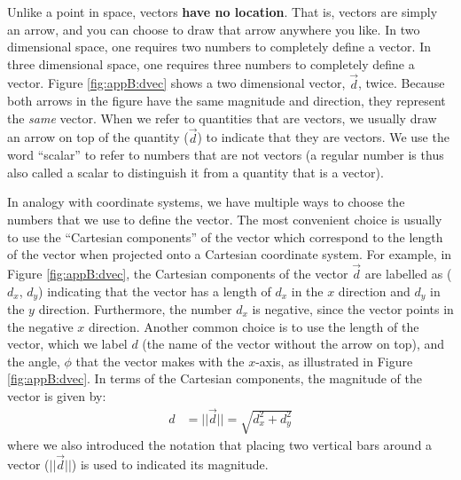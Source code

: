 Unlike a point in space, vectors \textbf{have no location}. That is, vectors are simply an arrow, and you can choose to draw that arrow anywhere you like. In two dimensional space, one requires two numbers to completely define a vector. In three dimensional space, one requires three numbers to completely define a vector. Figure \ref{fig:appB:dvec} shows a two dimensional vector, $\vec d$, twice. Because both arrows in the figure have the same magnitude and direction, they represent the \textit{same} vector. When we refer to quantities that are vectors, we usually draw an arrow on top of the quantity ($\vec d$) to indicate that they are vectors. We use the word ``scalar'' to refer to numbers that are not vectors (a regular number is thus also called a scalar to distinguish it from a quantity that is a vector).


In analogy with coordinate systems, we have multiple ways to choose the numbers that we use to define the vector. The most convenient choice is usually to use the ``Cartesian components'' of the vector which correspond to the length of the vector when projected onto a Cartesian coordinate system. For example, in Figure \ref{fig:appB:dvec}, the Cartesian components of the vector $\vec d$ are labelled as ($d_x$, $d_y$) indicating that the vector has a length of $d_x$ in the $x$ direction and $d_y$ in the $y$ direction. Furthermore, the number $d_x$ is negative, since the vector points in the negative $x$ direction. Another common choice is to use the length of the vector, which we label $d$ (the name of the vector without the arrow on top), and the angle, $\phi$ that the vector makes with the $x$-axis, as illustrated in Figure \ref{fig:appB:dvec}. In terms of the Cartesian components, the magnitude of the vector is given by:
\begin{align*}
d&= ||\vec d||= \sqrt{d_x^2+d_y^2}
\end{align*}
where we also introduced the notation that placing two vertical bars around a vector ($||\vec d||$) is used to indicated its magnitude.



